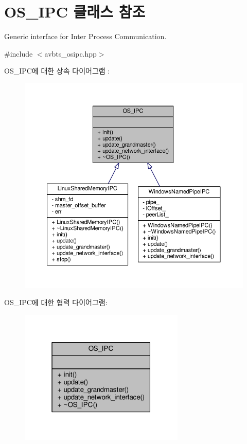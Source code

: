 \hypertarget{class_o_s___i_p_c}{}\section{O\+S\+\_\+\+I\+PC 클래스 참조}
\label{class_o_s___i_p_c}


Generic interface for Inter Process Communication.  




{\ttfamily \#include $<$avbts\+\_\+osipc.\+hpp$>$}



O\+S\+\_\+\+I\+P\+C에 대한 상속 다이어그램 \+: 
\nopagebreak
\begin{figure}[H]
\begin{center}
\leavevmode
\includegraphics[width=350pt]{class_o_s___i_p_c__inherit__graph}
\end{center}
\end{figure}


O\+S\+\_\+\+I\+P\+C에 대한 협력 다이어그램\+:
\nopagebreak
\begin{figure}[H]
\begin{center}
\leavevmode
\includegraphics[width=223pt]{class_o_s___i_p_c__coll__graph}
\end{center}
\end{figure}
